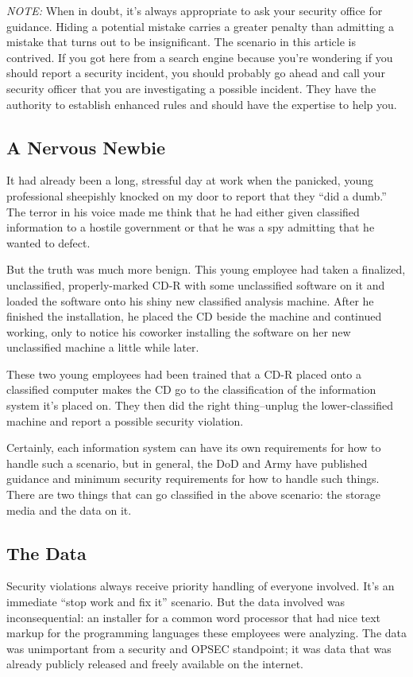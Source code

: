 \textit{NOTE:} When in doubt, it's always appropriate to ask your security office for guidance. Hiding a potential mistake carries a greater penalty than admitting a mistake that turns out to be insignificant. The scenario in this article is contrived. If you got here from a search engine because you're wondering if you should report a security incident, you should probably go ahead and call your security officer that you are investigating a possible incident. They have the authority to establish enhanced rules and should have the expertise to help you.

\subsection{A Nervous Newbie}

It had already been a long, stressful day at work when the panicked, young professional sheepishly knocked on my door to report that they ``did a dumb.'' The terror in his voice made me think that he had either given classified information to a hostile government or that he was a spy admitting that he wanted to defect.

But the truth was much more benign. This young employee had taken a finalized, unclassified, properly-marked CD-R with some unclassified software on it and loaded the software onto his shiny new classified analysis machine. After he finished the installation, he placed the CD beside the machine and continued working, only to notice his coworker installing the software on her new unclassified machine a little while later.

These two young employees had been trained that a CD-R placed onto a classified computer makes the CD go to the classification of the information system it's placed on. They then did the right thing--unplug the lower-classified machine and report a possible security violation.

Certainly, each information system can have its own requirements for how to handle such a scenario, but in general, the DoD and Army have published guidance and minimum security requirements for how to handle such things. There are two things that can go classified in the above scenario: the storage media and the data on it.

\subsection{The Data}
Security violations always receive priority handling of everyone involved. It's an immediate ``stop work and fix it'' scenario. But the data involved was inconsequential: an installer for a common word processor that had nice text markup for the programming languages these employees were analyzing. The data was unimportant from a security and OPSEC standpoint; it was data that was already publicly released and freely available on the internet.

